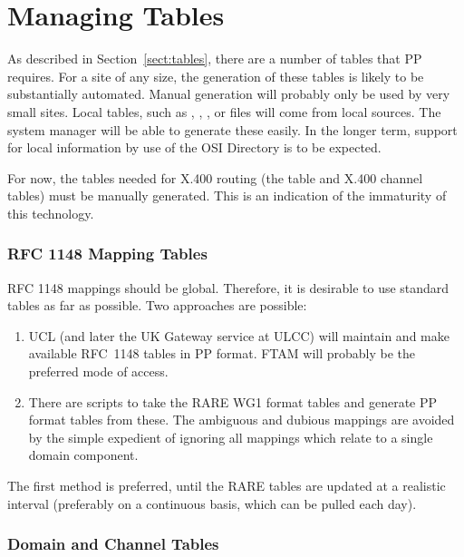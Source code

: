 \section {Managing Tables}

As described in Section~\ref{sect:tables}, there are a number of tables
that PP requires. For a site of any size, the generation of these
tables is likely to be substantially automated.  Manual generation will
probably only be used by very small sites.
Local tables, such as , , ,
 or  files
will come from local sources.  The system manager
will be able to generate these easily.  In the longer term, support for
local information  by use of the OSI Directory is to be expected.

For now, the tables needed for X.400 routing (the  table and X.400
channel tables) must be manually generated.  This is an indication of the
immaturity of this technology.   

\subsubsection {RFC 1148 Mapping Tables}

RFC 1148 mappings should be global.  Therefore, it is desirable to use
standard tables as far as possible.  Two approaches are possible:

\begin {enumerate}
\item UCL (and later the UK Gateway service at ULCC) will maintain and make
available RFC~1148 tables in PP format.  FTAM will probably be the preferred
mode of access.

\item There are scripts to take the RARE WG1 format tables and
generate PP format tables from these.  The ambiguous and dubious
mappings are avoided by the simple expedient of ignoring all mappings
which relate to a single domain component.
\end {enumerate}

The first method is preferred, until the RARE tables are updated at a
realistic interval (preferably on a continuous basis, which can be pulled
each day).

\subsubsection {Domain and Channel Tables}

